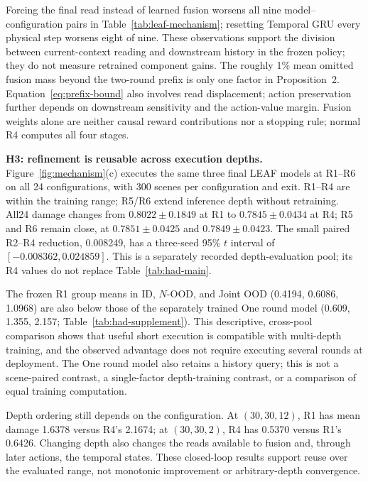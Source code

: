 Forcing the final read instead of learned fusion worsens all nine model--configuration pairs in Table~\ref{tab:leaf-mechanism}; resetting Temporal GRU every physical step worsens eight of nine. These observations support the division between current-context reading and downstream history in the frozen policy; they do not measure retrained component gains. The roughly 1\% mean omitted fusion mass beyond the two-round prefix is only one factor in Proposition~2. Equation~\eqref{eq:prefix-bound} also involves read displacement; action preservation further depends on downstream sensitivity and the action-value margin. Fusion weights alone are neither causal reward contributions nor a stopping rule; normal R4 computes all four stages.

\noindent\textbf{H3: refinement is reusable across execution depths.}
Figure~\ref{fig:mechanism}(c) executes the same three final LEAF models at R1--R6 on all 24 configurations, with 300 scenes per configuration and exit. R1--R4 are within the training range; R5/R6 extend inference depth without retraining. All24 damage changes from $0.8022\pm0.1849$ at R1 to $0.7845\pm0.0434$ at R4; R5 and R6 remain close, at $0.7851\pm0.0425$ and $0.7849\pm0.0423$. The small paired R2--R4 reduction, 0.008249, has a three-seed 95\% $t$ interval of $[-0.008362,0.024859]$. This is a separately recorded depth-evaluation pool; its R4 values do not replace Table~\ref{tab:had-main}.

The frozen R1 group means in ID, $N$-OOD, and Joint OOD (0.4194, 0.6086, 1.0968) are also below those of the separately trained One round model (0.609, 1.355, 2.157; Table~\ref{tab:had-supplement}). This descriptive, cross-pool comparison shows that useful short execution is compatible with multi-depth training, and the observed advantage does not require executing several rounds at deployment. The One round model also retains a history query; this is not a scene-paired contrast, a single-factor depth-training contrast, or a comparison of equal training computation.

Depth ordering still depends on the configuration. At $(30,30,12)$, R1 has mean damage 1.6378 versus R4's 2.1674; at $(30,30,2)$, R4 has 0.5370 versus R1's 0.6426. Changing depth also changes the reads available to fusion and, through later actions, the temporal states. These closed-loop results support reuse over the evaluated range, not monotonic improvement or arbitrary-depth convergence.



\HadSupplementTable

